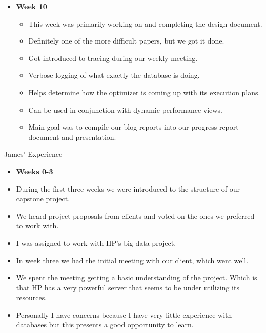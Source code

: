 \documentclass[xcolor=dvipsnames]{beamer}
\begin{document}
\begin{frame}
\begin{itemize}
	\item \textbf{Week 10}
    \begin{itemize}
    	\item This week was primarily working on and completing the design document.
    	\item Definitely one of the more difficult papers, but we got it done.
    	\item Got introduced to tracing during our weekly meeting.
    	\item Verbose logging of what exactly the database is doing.
    	\item Helps determine how the optimizer is coming up with its execution plans.
    	\item Can be used in conjunction with dynamic performance views.
    	\item Main goal was to compile our blog reports into our progress report document and presentation.
	\end{itemize}
\end{itemize}
\end{frame}

\begin{frame}
	\begin{center}
		\huge James' Experience
    \end{center}
\end{frame}

\begin{frame}
\begin{itemize}
	\item \textbf{Weeks 0-3}
	\item During the first three weeks we were introduced to   the structure of our capstone project.
    \item We heard project proposals from clients and voted on the ones we preferred to work with. 
    \item I was assigned to work with HP's big data project.
    \item In week three we had the initial meeting with our client, which went well.
    \item We spent the meeting getting a basic understanding of the project. Which is that HP has a very powerful server that seems to be under utilizing its resources.
    \item Personally I have concerns because I have very little experience with databases but this presents a good opportunity to learn.
\end{itemize}
\end{frame}
\end{document}

